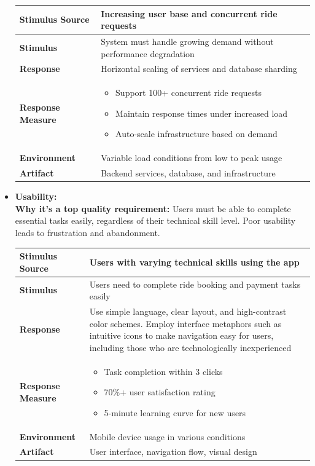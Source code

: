 \documentclass[12pt]{article}
\begin{document}
\begin{itemize}
  \begin{table}[h]
\centering
\begin{tabular}{|l|p{10cm}|}
\hline
\textbf{Stimulus Source} & Increasing user base and concurrent ride requests \\
\hline
\textbf{Stimulus} & System must handle growing demand without performance degradation \\
\hline
\textbf{Response} & Horizontal scaling of services and database sharding \\
\hline
\textbf{Response Measure} & 
\begin{itemize}
  \item Support 100+ concurrent ride requests
  \item Maintain response times under increased load
  \item Auto-scale infrastructure based on demand
\end{itemize} \\
\hline
\textbf{Environment} & Variable load conditions from low to peak usage \\
\hline
\textbf{Artifact} & Backend services, database, and infrastructure \\
\hline
\end{tabular}
\end{table}

  \item \textbf{Usability:} \\
  \textbf{Why it's a top quality requirement:} Users must be able to complete essential tasks easily, regardless of their technical skill level. Poor usability leads to frustration and abandonment. \\

\begin{table}[h]
\centering
\begin{tabular}{|l|p{10cm}|}
\hline
\textbf{Stimulus Source} & Users with varying technical skills using the app \\
\hline
\textbf{Stimulus} & Users need to complete ride booking and payment tasks easily \\
\hline
\textbf{Response} & Use simple language, clear layout, and high-contrast color schemes. Employ interface metaphors such as intuitive icons to make navigation easy for users, including those who are technologically inexperienced \\
\hline
\textbf{Response Measure} & 
\begin{itemize}
  \item Task completion within 3 clicks
  \item 70\%+ user satisfaction rating
  \item 5-minute learning curve for new users
\end{itemize} \\
\hline
\textbf{Environment} & Mobile device usage in various conditions \\
\hline
\textbf{Artifact} & User interface, navigation flow, visual design \\
\hline
\end{tabular}
\end{table}


\end{itemize}
\end{document}
